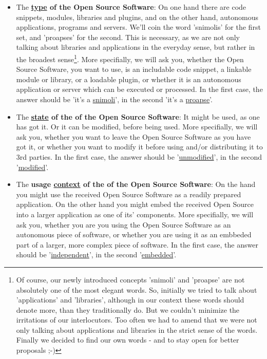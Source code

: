 \label{OsucTokens}
\begin{itemize}
  \item The \textbf{\underline{type} of the Open Source Software}: On one hand
  there are code snippets, modules, libraries and plugins, and on the other
  hand, autonomous applications, programs and servers. We’ll coin the word
  ’snimolis’ for the first set, and ’proapses’ for the second. This is
  necessary, as we are not only talking about libraries and applications in the
  everyday sense, but rather in the broadest sense\footnote{Of course, our newly
  introduced concepts 'snimoli' and 'proapse' are not absolutely one of the most
  elegant words. So, initially we tried to talk about 'applications' and
  'libraries', although in our context these words should denote more, than they
  traditionally do. But we couldn't minimize the irritations of our
  interlocutors. Too often we had to amend that we were not only talking about
  applications and libraries in the strict sense of the words. Finally we
  decided to find our own words - and to stay open for better proposals ;-) }.
  More specifially, we will ask you, whether the Open Source Software, you
  want to use, is an includable code snippet, a linkable module or library, or a
  loadable plugin, or whether it is an autonomous application or server which
  can be executed or processed. In the first case, the answer should be 'it's a
  \underline{snimoli}', in the second 'it's a \underline{proapse}'.

  \item The \textbf{\underline{state} of the of the Open Source Software}: It
  might be used, as one has got it. Or it can be modified, before being used.
  More specifially, we will ask you, whether you want to leave the Open Source
  Software as you have got it, or whether you want to modify it before using
  and/or distributing it to 3rd parties. In the first case, the answer should be
  '\underline{unmodified}', in the second '\underline{modified}'.
  
  \item The \textbf{usage \underline{context} of the of the Open Source
  Software}: On the hand you might use the received Open Source Software as a
  readily prepared application. On the other hand you might embed the received
  Open Source into a larger application as one of its' components. More
  specifially, we will ask you, whether you are you using the Open Source
  Software as an autonomous piece of software, or whether you are using it as an
  embbeded part of a larger, more complex piece of software. In the first case,
  the answer should be '\underline{independent}', in the second
  '\underline{embedded}'.
  

\end{itemize}
